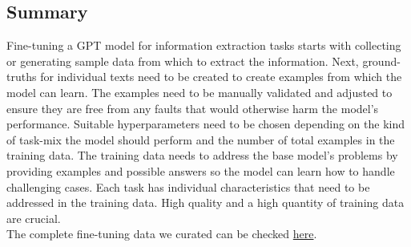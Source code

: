 \subsection*{Summary}
Fine-tuning a GPT model for information extraction tasks starts with collecting or generating sample data from which to extract the information. Next, ground-truths for individual texts need to be created to create examples from which the model can learn. The examples need to be manually validated and adjusted to ensure they are free from any faults that would otherwise harm the model's performance. Suitable hyperparameters need to be chosen depending on the kind of task-mix the model should perform and the number of total examples in the training data. The training data needs to address the base model's problems by providing examples and possible answers so the model can learn how to handle challenging cases. Each task has individual characteristics that need to be addressed in the training data. High quality and a high quantity of training data are crucial.\\
The complete fine-tuning data we curated can be checked \href{https://github.com/FR-SON/Bachelor-Thesis}{here}.